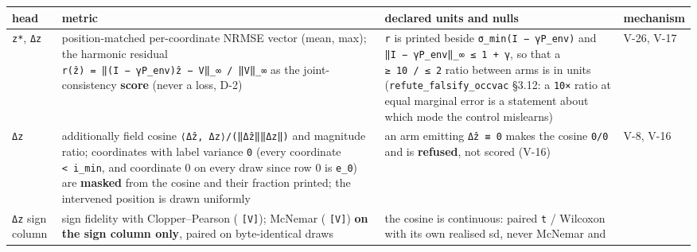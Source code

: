 \documentclass[11pt,a4paper]{article}
\newcounter{none}                 %
\theoremstyle{plain}
\theoremstyle{definition}
\theoremstyle{remark}
\begin{document}
{\def\LTcaptype{none} %
\begin{longtable}[]{@{}
  >{\raggedright\arraybackslash}p{}
  >{\raggedright\arraybackslash}p{}
  >{\raggedright\arraybackslash}p{}
  >{\raggedright\arraybackslash}p{}@{}}
\toprule\noalign{}
\begin{minipage}[b]{\linewidth}\raggedright
head
\end{minipage} & \begin{minipage}[b]{\linewidth}\raggedright
metric
\end{minipage} & \begin{minipage}[b]{\linewidth}\raggedright
declared units and nulls
\end{minipage} & \begin{minipage}[b]{\linewidth}\raggedright
mechanism
\end{minipage} \\
\midrule\noalign{}
\endhead
\bottomrule\noalign{}
\endlastfoot
\texttt{z*}, \texttt{Δz} & position-matched per-coordinate NRMSE vector
(mean, max); the harmonic residual
\texttt{r(ẑ)\ =\ ‖(I\ −\ γP\_env)ẑ\ −\ V‖\_∞\ /\ ‖V‖\_∞} as the
joint-consistency \textbf{score} (never a loss, D-2) & \texttt{r} is
printed beside \texttt{σ\_min(I\ −\ γP\_env)} and
\texttt{‖I\ −\ γP\_env‖\_∞\ ≤\ 1\ +\ γ}, so that a
\texttt{≥\ 10\ /\ ≤\ 2} ratio between arms is in units
(\texttt{refute\_falsify\_occvac} §3.12: a \texttt{10×} ratio at equal
marginal error is a statement about which mode the control mislearns) &
V-26, V-17 \\
\texttt{Δz} & additionally field cosine \texttt{⟨Δẑ,\ Δz⟩/(‖Δẑ‖‖Δz‖)}
and magnitude ratio; coordinates with label variance \texttt{0} (every
coordinate \texttt{\textless{}\ i\_min}, and coordinate 0 on every draw
since row 0 is \texttt{e\_0}) are \textbf{masked} from the cosine and
their fraction printed; the intervened position is drawn uniformly & an
arm emitting \texttt{Δẑ\ ≡\ 0} makes the cosine \texttt{0/0} and is
\textbf{refused}, not scored (V-16) & V-8, V-16 \\
\texttt{Δz} sign column & sign fidelity with Clopper--Pearson
(\citep{clopper-1934-binomial} \texttt{{[}V{]}}); McNemar
(\citep{mcnemar-1947-correlated} \texttt{{[}V{]}}) \textbf{on the sign
column only}, paired on byte-identical draws & the cosine is continuous:
paired \texttt{t} / Wilcoxon with its own realised sd, never McNemar and

\end{longtable}}
\end{document}
